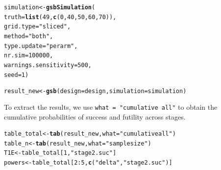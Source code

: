 \documentclass{article}\usepackage[]{graphicx}\usepackage[]{xcolor}
\makeatletter
\newcommand{\hlnum}[1]{\textcolor[rgb]{0.686,0.059,0.569}{#1}}%
\newcommand{\hlsng}[1]{\textcolor[rgb]{0.192,0.494,0.8}{#1}}%
\newcommand{\hlopt}[1]{\textcolor[rgb]{0,0,0}{#1}}%
\newcommand{\hldef}[1]{\textcolor[rgb]{0.345,0.345,0.345}{#1}}%
\newcommand{\hlkwb}[1]{\textcolor[rgb]{0.69,0.353,0.396}{#1}}%
\newcommand{\hlkwc}[1]{\textcolor[rgb]{0.333,0.667,0.333}{#1}}%
\newcommand{\hlkwd}[1]{\textcolor[rgb]{0.737,0.353,0.396}{\textbf{#1}}}%
\newenvironment{kframe}{%
 \def\at@end@of@kframe{}%
 \ifinner\ifhmode%
  \def\at@end@of@kframe{\end{minipage}}%
  \begin{minipage}{\columnwidth}%
 \fi\fi%
 \def\FrameCommand##1{\hskip\@totalleftmargin \hskip-\fboxsep
 \colorbox{shadecolor}{##1}\hskip-\fboxsep
     \hskip-\linewidth \hskip-\@totalleftmargin \hskip\columnwidth}%
 \MakeFramed {\advance\hsize-\width
   \@totalleftmargin\z@ \linewidth\hsize
   \@setminipage}}%
 {\par\unskip\endMakeFramed%
 \at@end@of@kframe}
\newenvironment{knitrout}{}{} %
\makeatother
\begin{document}
\begin{knitrout}
\color{fgcolor}\begin{kframe}
\begin{alltt}
\hldef{simulation} \hlkwb{<-} \hlkwd{gsbSimulation}\hldef{(}
  \hlkwc{truth}\hldef{=}\hlkwd{list}\hldef{(}\hlnum{49}\hldef{,}\hlkwd{c}\hldef{(}\hlnum{0}\hldef{,}\hlnum{40}\hldef{,}\hlnum{50}\hldef{,}\hlnum{60}\hldef{,}\hlnum{70}\hldef{)),}
  \hlkwc{grid.type}\hldef{=}\hlsng{"sliced"}\hldef{,}
  \hlkwc{method} \hldef{=} \hlsng{"both"}\hldef{,}
  \hlkwc{type.update}\hldef{=}\hlsng{"per arm"}\hldef{,}
  \hlkwc{nr.sim}\hldef{=}\hlnum{100000}\hldef{,}
  \hlkwc{warnings.sensitivity} \hldef{=} \hlnum{500}\hldef{,}
  \hlkwc{seed}\hldef{=}\hlnum{1}\hldef{)}
\end{alltt}
\end{kframe}
\end{knitrout}

\begin{knitrout}
\color{fgcolor}\begin{kframe}
\begin{alltt}
\hldef{result_new} \hlkwb{<-} \hlkwd{gsb}\hldef{(}\hlkwc{design}\hldef{=design,}\hlkwc{simulation}\hldef{=simulation)}
\end{alltt}
\end{kframe}
\end{knitrout}

To extract the results, we use \texttt{what = "cumulative all"} to obtain the cumulative probabilities of success and futility across stages.

\begin{knitrout}
\color{fgcolor}\begin{kframe}
\begin{alltt}
\hldef{table_total} \hlkwb{<-} \hlkwd{tab}\hldef{(result_new,} \hlkwc{what} \hldef{=} \hlsng{"cumulative all"}\hldef{)}
\hldef{table_n} \hlkwb{<-} \hlkwd{tab}\hldef{(result_new,} \hlkwc{what} \hldef{=} \hlsng{"sample size"}\hldef{)}
\hldef{T1E} \hlkwb{<-} \hldef{table_total[}\hlnum{1}\hldef{,} \hlsng{"stage2.suc"}\hldef{]}
\hldef{powers} \hlkwb{<-} \hldef{table_total[}\hlnum{2}\hlopt{:}\hlnum{5}\hldef{,} \hlkwd{c}\hldef{(}\hlsng{"delta"}\hldef{,} \hlsng{"stage2.suc"}\hldef{)]}
\end{alltt}
\end{kframe}
\end{knitrout}
\end{document}
